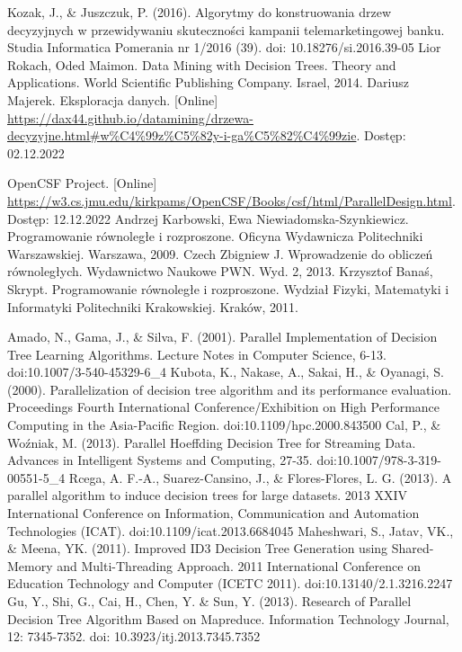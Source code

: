 \documentclass[12pt]{article}
\begin{document}
\cleardoublepage
{}
{}
\begin{thebibliography}{20}

     Kozak, J., \& Juszczuk, P. (2016). Algorytmy do konstruowania drzew decyzyjnych w przewidywaniu skuteczności kampanii telemarketingowej banku. Studia Informatica Pomerania nr 1/2016 (39). doi: 10.18276/si.2016.39-05
     Lior Rokach, Oded Maimon. Data Mining with Decision Trees. Theory and Applications. World Scientific Publishing Company. Israel, 2014.
     Dariusz Majerek. Eksploracja danych. [Online] \url{https://dax44.github.io/datamining/drzewa-decyzyjne.html#w%C4%99z%C5%82y-i-ga%C5%82%C4%99zie}. Dostęp: 02.12.2022
   
     OpenCSF Project. [Online] \url{https://w3.cs.jmu.edu/kirkpams/OpenCSF/Books/csf/html/ParallelDesign.html}. Dostęp: 12.12.2022
     Andrzej Karbowski, Ewa Niewiadomska-Szynkiewicz. Programowanie równoległe i rozproszone. Oficyna Wydawnicza Politechniki Warszawskiej. Warszawa, 2009.
     Czech Zbigniew J. Wprowadzenie do obliczeń równoległych. Wydawnictwo Naukowe PWN. Wyd. 2, 2013.
     Krzysztof Banaś, Skrypt. Programowanie równoległe i rozproszone. Wydział Fizyki, Matematyki i Informatyki Politechniki Krakowskiej. Kraków, 2011.

     Amado, N., Gama, J., \& Silva, F. (2001). Parallel Implementation of Decision Tree Learning Algorithms. Lecture Notes in Computer Science, 6-13. doi:10.1007/3-540-45329-6\_4 
     Kubota, K., Nakase, A., Sakai, H., \& Oyanagi, S. (2000). Parallelization of decision tree algorithm and its performance evaluation. Proceedings Fourth International Conference/Exhibition on High Performance Computing in the Asia-Pacific Region. doi:10.1109/hpc.2000.843500
     Cal, P., \& Woźniak, M. (2013). Parallel Hoeffding Decision Tree for Streaming Data. Advances in Intelligent Systems and Computing, 27-35. doi:10.1007/978-3-319-00551-5\_4
     Rcega, A. F.-A., Suarez-Cansino, J., \& Flores-Flores, L. G. (2013). A parallel algorithm to induce decision trees for large datasets. 2013 XXIV International Conference on Information, Communication and Automation Technologies (ICAT). doi:10.1109/icat.2013.6684045 
     Maheshwari, S., Jatav, VK., \& Meena, YK. (2011). Improved ID3 Decision Tree Generation using Shared-Memory and Multi-Threading Approach. 2011 International Conference on Education Technology and Computer (ICETC 2011). doi:10.13140/2.1.3216.2247
     Gu, Y., Shi, G., Cai, H., Chen, Y. \& Sun, Y. (2013). Research of Parallel Decision Tree Algorithm Based on Mapreduce. Information Technology Journal, 12: 7345-7352. doi: 10.3923/itj.2013.7345.7352

\end{thebibliography}
\end{document}
